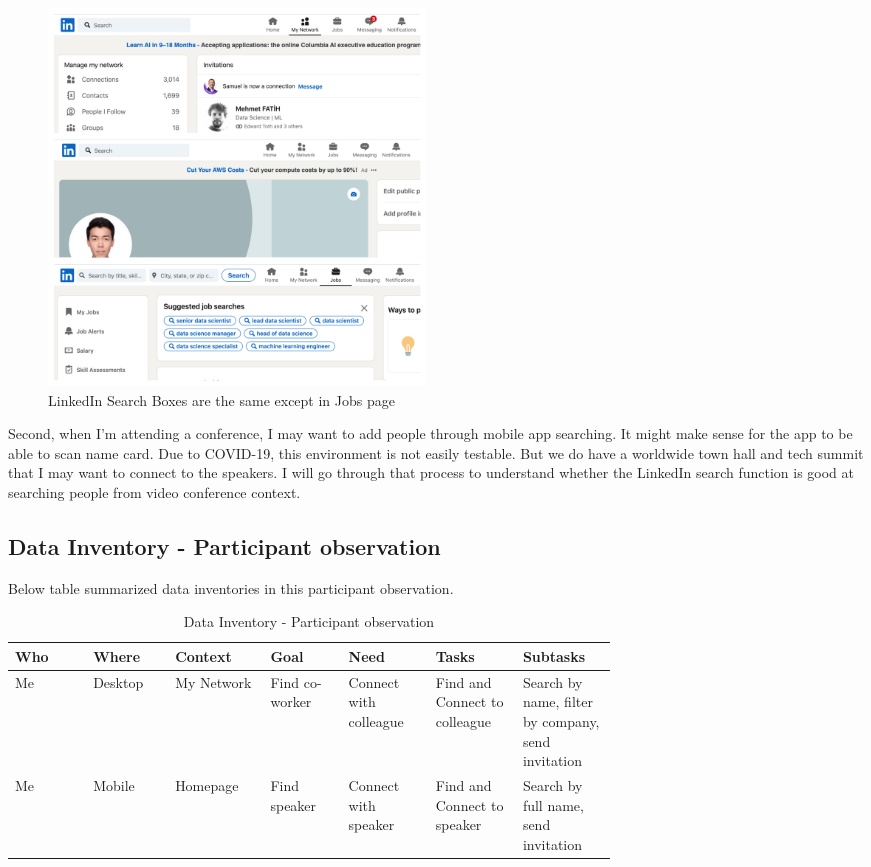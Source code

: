 \documentclass[
	letterpaper, %
]{jdf}
\begin{document}
\begin{figure}[h]
	\centering
	\includegraphics[height=10cm]{Figures/search_box2.png}
	\caption{LinkedIn Search Boxes are the same except in Jobs page}
	\label{fig:search_box2}
\end{figure}

Second, when I'm attending a conference, I may want to add people through mobile app searching. It might make sense for the app to be able to scan name card. Due to COVID-19, this environment is not easily testable. But we do have a worldwide town hall and tech summit that I may want to connect to the speakers. I will go through that process to understand whether the LinkedIn search function is good at searching people from video conference context.

\subsection{Data Inventory - Participant observation}
Below table summarized data inventories in this participant observation.

\begin{table}[h] %
	\caption{Data Inventory - Participant observation}
	\small %
	\centering %
	\begin{tabular}{L{0.1\linewidth} L{0.1\linewidth} L{0.1\linewidth} L{0.1\linewidth} L{0.1\linewidth} L{0.1\linewidth} L{0.1\linewidth}}
		\textbf{Who} & \textbf{Where} & \textbf{Context} & \textbf{Goal} & \textbf{Need} & \textbf{Tasks} & \textbf{Subtasks}\\
		\toprule[0.5pt]
		Me & Desktop & My Network & Find co-worker & Connect with colleague & Find and Connect to colleague & Search by name, filter by company, send invitation\\
		\midrule
		Me & Mobile & Homepage & Find speaker & Connect with speaker & Find and Connect to speaker & Search by full name, send invitation\\

	\end{tabular}
\end{table}
\end{document}
